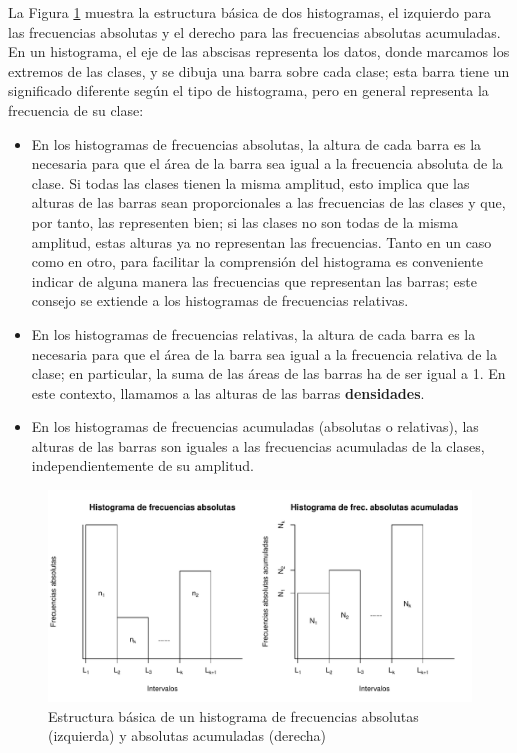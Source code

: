\documentclass[
]{book}
\theoremstyle{definition}
\theoremstyle{definition}
\theoremstyle{definition}
\theoremstyle{remark}
\begin{document}
La Figura \ref{fig:205} muestra la estructura básica de dos histogramas, el izquierdo para las frecuencias absolutas y el derecho para las frecuencias absolutas acumuladas. En un histograma, el eje de las abscisas representa los datos, donde marcamos los extremos de las clases, y se dibuja una barra sobre cada clase; esta barra tiene un significado diferente según el tipo de histograma, pero en general representa la frecuencia de su clase:

\begin{itemize}
\item
  En los histogramas de frecuencias absolutas, la altura de cada barra es la necesaria para que el área de la barra sea igual a la frecuencia absoluta de la clase. Si todas las clases tienen la misma amplitud, esto implica que las alturas de las barras sean proporcionales a las frecuencias de las clases y que, por tanto, las representen bien; si las clases no son todas de la misma amplitud, estas alturas ya no representan las frecuencias. Tanto en un caso como en otro, para facilitar la comprensión del histograma es conveniente indicar de alguna manera las frecuencias que representan las barras;
  este consejo se extiende a los histogramas de frecuencias relativas.
\item
  En los histogramas de frecuencias relativas, la altura de cada barra es la necesaria para que el área de la barra sea igual a la frecuencia relativa de la clase; en particular, la suma de las áreas de las barras ha de ser igual a 1. En este contexto, llamamos a las alturas de las barras \textbf{densidades}.
\item
  En los histogramas de frecuencias acumuladas (absolutas o relativas), las alturas de las barras son iguales a las frecuencias acumuladas de la clases, independientemente de su amplitud.
\end{itemize}

\begin{figure}

{\centering \includegraphics[width=0.9\linewidth]{13chap13_Agrupados_files/figure-latex/205-1} 

}

\caption{Estructura básica de un histograma de frecuencias absolutas (izquierda) y absolutas acumuladas (derecha)}\label{fig:205}
\end{figure}
\end{document}
